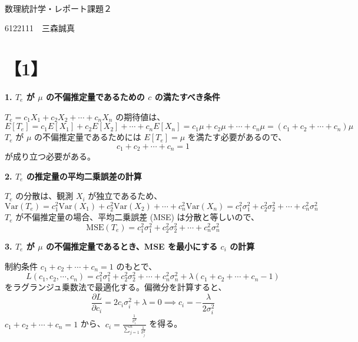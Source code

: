 \documentclass[10pt]{jsarticle}
\begin{document}
 \ 
\vspace{100pt}
\begin{center}
\begin{Huge}
数理統計学・レポート課題２   
\end{Huge}

\bigskip

\begin{huge}
6122111　三森誠真      
\end{huge}    
\end{center}

\newpage

\section*{【1】}
{\bf 1. \(T_e\) が \(\mu\) の不偏推定量であるための \(c\) の満たすべき条件}

\( T_e = c_1X_1 + c_2X_2 + \cdots + c_nX_n \) の期待値は、
\[
    E[T_e] = c_1 E[X_1] + c_2 E[X_2] + \cdots + c_n E[X_n] = c_1 \mu + c_2 \mu + \cdots + c_n \mu = (c_1 + c_2 + \cdots + c_n) \mu
\]
\(T_e\) が \(\mu\) の不偏推定量であるためには \(E[T_e] = \mu\) を満たす必要があるので、
\[
    c_1 + c_2 + \cdots + c_n = 1
\]
が成り立つ必要がある。

{\bf 2. \(T_e\) の推定量の平均二乗誤差の計算}

\(T_e\) の分散は、観測 \(X_i\) が独立であるため、
\[
    \text{Var}(T_e) = c_1^2 \text{Var}(X_1) + c_2^2 \text{Var}(X_2) + \cdots + c_n^2 \text{Var}(X_n) = c_1^2 \sigma_1^2 + c_2^2 \sigma_2^2 + \cdots + c_n^2 \sigma_n^2
\]
\(T_e\) が不偏推定量の場合、平均二乗誤差 (MSE) は分散と等しいので、
\[
    \text{MSE}(T_e) = c_1^2 \sigma_1^2 + c_2^2 \sigma_2^2 + \cdots + c_n^2 \sigma_n^2
\]

{\bf 3. \(T_e\) が \(\mu\) の不偏推定量であるとき、MSE を最小にする \(c_i\) の計算}

制約条件 \(c_1 + c_2 + \cdots + c_n = 1\) のもとで、
\[
    L(c_1, c_2, \cdots, c_n) = c_1^2 \sigma_1^2 + c_2^2 \sigma_2^2 + \cdots + c_n^2 \sigma_n^2 + \lambda (c_1 + c_2 + \cdots + c_n - 1)
\]
をラグランジュ乗数法で最適化する。偏微分を計算すると、
\[
    \frac{\partial L}{\partial c_i} = 2c_i \sigma_i^2 + \lambda = 0 \implies c_i = -\frac{\lambda}{2 \sigma_i^2}
\]
\(c_1 + c_2 + \cdots + c_n = 1\) から、\(c_i = \frac{\frac{1}{\sigma_i^2}}{\sum_{j=1}^n \frac{1}{\sigma_j^2}}\) を得る。
\end{document}
